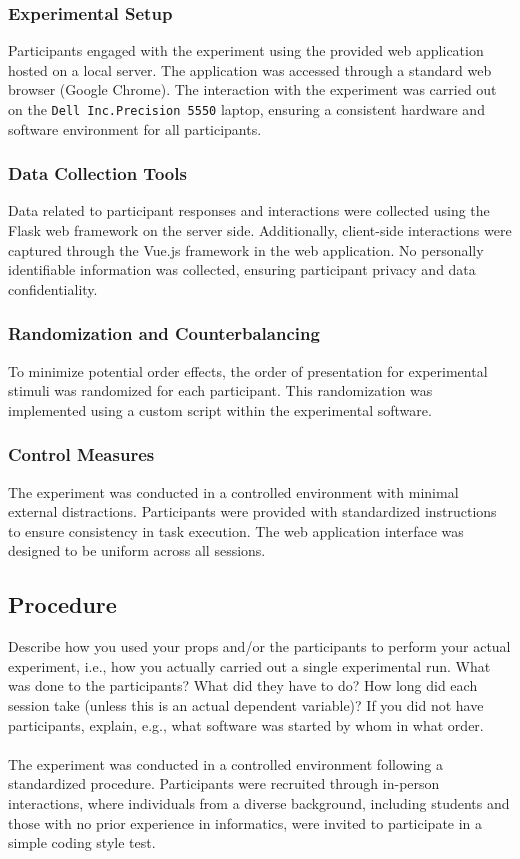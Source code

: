 \documentclass{article}
\begin{document}
\subsubsection*{Experimental Setup}
Participants engaged with the experiment using the provided web application hosted on a local server. The application was accessed through a standard web browser (Google Chrome). The interaction with the experiment was carried out on the \texttt{Dell Inc.Precision 5550} laptop, ensuring a consistent hardware and software environment for all participants.

\subsubsection*{Data Collection Tools}
Data related to participant responses and interactions were collected using the Flask web framework on the server side. Additionally, client-side interactions were captured through the Vue.js framework in the web application. No personally identifiable information was collected, ensuring participant privacy and data confidentiality.

\subsubsection*{Randomization and Counterbalancing}
To minimize potential order effects, the order of presentation for experimental stimuli was randomized for each participant. This randomization was implemented using a custom script within the experimental software.

\subsubsection*{Control Measures}
The experiment was conducted in a controlled environment with minimal external distractions. Participants were provided with standardized instructions to ensure consistency in task execution. The web application interface was designed to be uniform across all sessions.


\subsection{Procedure}
Describe how you used your props and/or the participants to perform your actual experiment, i.e., how you actually carried out a single experimental run. What was done to the participants? What did they have to do? How long did each session take (unless this is an actual dependent variable)? If you did not have participants, explain, e.g., what software was started by whom in what order.\\\\
The experiment was conducted in a controlled environment following a standardized procedure. Participants were recruited through in-person interactions, where individuals from a diverse background, including students and those with no prior experience in informatics, were invited to participate in a simple coding style test.
\end{document}
